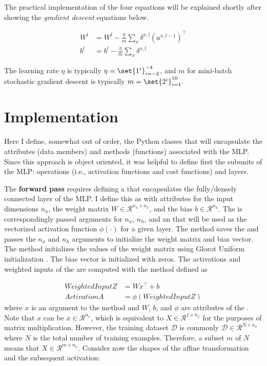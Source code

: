 \documentclass{article}
\DeclarePairedDelimiter\set\{\}
\begin{document}
The practical implementation of the four equations will be explained shortly
after showing the \textit{gradient descent} equations below.

\begin{align}
	W^{l} & = W^{l} - \frac{\eta}{m} \sum_{x}{\delta^{x, l}(a^{x, l-1})^\top} \\
	b^{l} & = b^{l} - \frac{\eta}{m} \sum_{x}{\delta^{x, l}}
\end{align}

The learning rate $\eta$ is typically $\eta = \set{1^{i}}_{i=-2}^{-4}$, and $m$
for mini-batch stochastic gradient descent is typically
$m = \set{2^{i}}_{i=1}^{10}$.

\section{Implementation}

\quad Here I define, somewhat out of order, the Python classes
that will encapsulate the attributes (data members) and methods (functions) associated
with the MLP. Since this approach is object oriented, it was helpful to
define first the subunits of the MLP: operations (i.e., activation functions and
cost functions) and layers.

The \textbf{forward pass} requires defining a  that
encapsulates the fully/densely connected layer of the MLP. I define this as
 with attributes for the input dimensions $n_x$,
the weight matrix $W \in \mathcal{R}^{n_h \times n_x}$, and the bias
$b \in \mathcal{R}^{n_h}$. The  is correspondingly passed
arguments for $n_x$, $n_h$, and an 
that will be used as the vectorized activation function $\phi(\cdot)$ for a given layer.
The  method saves the  and passes
the $n_x$ and $n_h$ arguments to initialize the weight matrix and bias vector.
The  method initializes the values of the weight matrix
using Glorot Uniform initialization \cite{Glorot2010}. The bias vector is
initialized with zeros. The activations and weighted inputs of the 
are computed with the  method defined as

\begin{align}
	WeightedInputZ & = Wx^{\top} + b        \\
	ActivationA    & = \phi(WeightedInputZ)
\end{align}
where $x$ is an argument to the  method and
$W$, $b$, and $\phi$ are attributes of the .
Note that $x$ can be $x \in \mathcal{R}^{n_x}$, which
is equivalent to $X \in \mathcal{R}^{1 \times n_x}$ for the purposes of matrix
multiplication. However, the training dataset $\mathcal{D}$ is commonly
$\mathcal{D} \in \mathcal{R}^{N \times n_x}$ where $N$ is the total number of
training examples. Therefore, a subset $m$ of $N$ means that
$X \in \mathcal{R}^{m \times n_x}$. Consider now the shapes of the affine transformation
and the subsequent activation:
\end{document}
